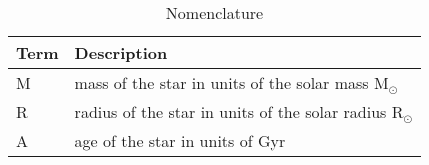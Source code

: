 \documentclass[a4paper, oneside, 11pt, article, english]{memoir}
\begin{document}
\begin{table}[htbp]
  \centering
  \caption{Nomenclature}
  \label{tab:nomenclature}
  \begin{tabular}{@{}lp{9cm}@{}}
    \toprule
    Term                & Description                                                                                                                                                                                                                                                                                                                                                     \\
    \midrule
    M & mass of the star in units of the solar mass M$_\odot$ \\
    R & radius of the star in units of the solar radius R$_\odot$ \\
    A & age of the star in units of Gyr \\
    \bottomrule
  \end{tabular}
\end{table}
\end{document}
